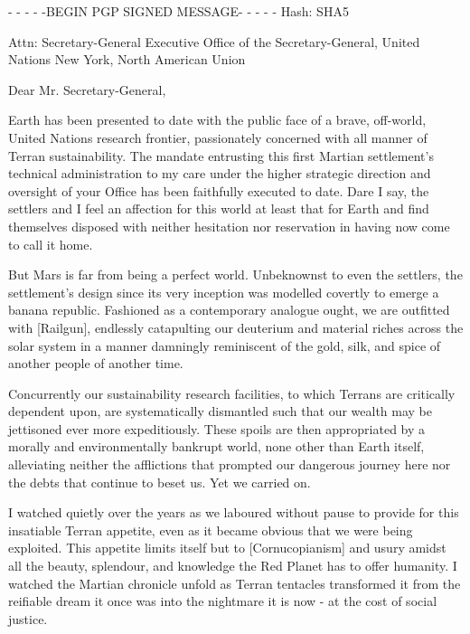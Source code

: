 
- - - - -BEGIN PGP SIGNED MESSAGE- - - - -
Hash: SHA5

Attn: Secretary-General
Executive Office of the Secretary-General, United Nations
New York, North American Union
\blank

Dear Mr. Secretary-General,

Earth has been presented to date with the public face of a brave, off-world, United Nations research frontier, passionately concerned with all manner of Terran sustainability. The mandate entrusting this first Martian settlement's technical administration to my care under the higher strategic direction and oversight of your Office has been faithfully executed to date. Dare I say, the settlers and I feel an affection for this world at least that for Earth and find themselves disposed with neither hesitation nor reservation in having now come to call it home.

But Mars is far from being a perfect world. Unbeknownst to even the settlers, the settlement's design since its very inception was modelled covertly to emerge a banana republic. Fashioned as a contemporary analogue ought, we are outfitted with [Railgun], endlessly catapulting our deuterium and material riches across the solar system in a manner damningly reminiscent of the gold, silk, and spice of another people of another time.

Concurrently our sustainability research facilities, to which Terrans are critically dependent upon, are systematically dismantled such that our wealth may be jettisoned ever more expeditiously. These spoils are then appropriated by a morally and environmentally bankrupt world, none other than Earth itself, alleviating neither the afflictions that prompted our dangerous journey here nor the debts that continue to beset us. Yet we carried on.

I watched quietly over the years as we laboured without pause to provide for this insatiable Terran appetite, even as it became obvious that we were being exploited. This appetite limits itself but to [Cornucopianism] and usury amidst all the beauty, splendour, and knowledge the Red Planet has to offer humanity. I watched the Martian chronicle unfold as Terran tentacles transformed it from the reifiable dream it once was into the nightmare it is now - at the cost of social justice. 

